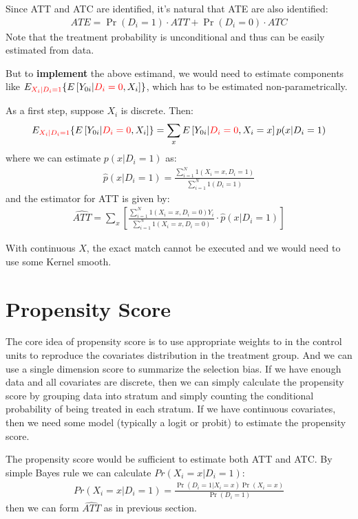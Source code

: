 Since ATT and ATC are identified, it's natural that ATE are also identified:
\begin{align*}
    ATE = \Pr(D_i=1) \cdot ATT + \Pr(D_i=0) \cdot ATC
\end{align*}
Note that the treatment probability is unconditional and thus can be easily estimated from data.

But to \textbf{implement} the above estimand, we would need to estimate components like $E_{{\color{red} X_i|D_i=1}} \{E\left[Y_{0i}|{\color{red} D_i=0},X_i\right] \}$, which has to be estimated non-parametrically.

As a first step, suppose $X_i$ is discrete. 
Then:
\begin{align*}
    E_{{\color{red} X_i|D_i=1}} \{E\left[Y_{0i}|{\color{red} D_i=0},X_i\right] \}
    = \sum_x E\left[Y_{0i}|{\color{red} D_i=0},X_i = x\right] p(x|D_i=1)
\end{align*}
where we can estimate $p(x|D_i=1)$ as:
\begin{align*}
    \hat p(x|D_i=1) = \frac{\sum_{i=1}^{N} {1(X_i=x,D_i=1)}}{\sum_{i=1}^{N} {1(D_i=1)}}
\end{align*}
and the estimator for ATT is given by:
\begin{align*}
    \widehat {ATT} = \sum_{x} \left [
    \frac{\sum_{i=1}^{N} {1(X_i=x,D_i=0)Y_i}} {\sum_{i=1}^{N} {1(X_i=x, D_i=0)}} \cdot \hat p(x|D_i=1)
    \right ]
\end{align*}

With continuous $X$, the exact match cannot be executed and we would need to use some Kernel smooth. 

\section{Propensity Score}
\label{sec:propensity_score}

The core idea of propensity score is to use appropriate weights to in the control units to reproduce the covariates distribution in the treatment group. 
And we can use a single dimension score to summarize the selection bias.
If we have enough data and all covariates are discrete, then we can simply calculate the propensity score by grouping data into stratum and simply counting the conditional probability of being treated in each stratum.
If we have continuous covariates, then we need some model (typically a logit or probit) to estimate the propensity score.

The propensity score would be sufficient to estimate both ATT and ATC. 
By simple Bayes rule we can calculate $Pr(X_i = x | D_i=1)$:
\begin{align*}
    Pr(X_i = x | D_i=1) = \frac{\Pr(D_i=1|X_i=x)\Pr(X_i=x)}{\Pr(D_i=1)}
\end{align*}
then we can form $\widehat{ATT}$ as in previous section.

